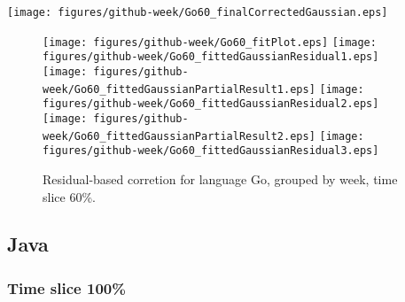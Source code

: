 \begin{center}
{\texttt{[image: figures/github-week/Go60\_finalCorrectedGaussian.eps]}}
\end{center}

\FloatBarrier

\begin{figure}[t]
\centering
{}
{\texttt{[image: figures/github-week/Go60\_fitPlot.eps]}}
{\texttt{[image: figures/github-week/Go60\_fittedGaussianResidual1.eps]}}
{\texttt{[image: figures/github-week/Go60\_fittedGaussianPartialResult1.eps]}}
{\texttt{[image: figures/github-week/Go60\_fittedGaussianResidual2.eps]}}
{\texttt{[image: figures/github-week/Go60\_fittedGaussianPartialResult2.eps]}}
{\texttt{[image: figures/github-week/Go60\_fittedGaussianResidual3.eps]}}
\caption{Residual-based corretion for language Go, grouped by week, time slice 60\%.}
\end{figure}


\FloatBarrier


\subsection{Java}

\subsubsection{Time slice 100\%}

